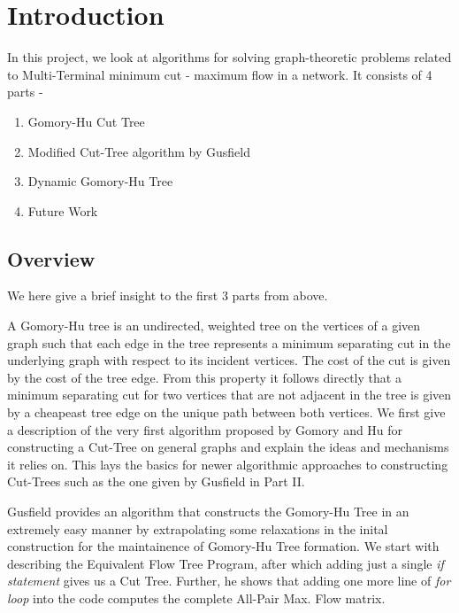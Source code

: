\chapter{Introduction}
    In this project, we look at algorithms for solving graph-theoretic problems related to Multi-Terminal minimum cut - maximum flow in a network. It consists of 4 parts - 
    \begin{enumerate}
        \item {Gomory-Hu Cut Tree}
        \item {Modified Cut-Tree algorithm by Gusfield}
        \item {Dynamic Gomory-Hu Tree}
        \item {Future Work}
    \end{enumerate}

    \section{Overview}
    We here give a brief insight to the first 3 parts from above.
    
    \vspace{5mm}
    A Gomory-Hu tree is an undirected, weighted tree on the vertices of a given graph such that each edge in the tree represents a minimum separating cut in the underlying graph with respect to its incident
    vertices. The cost of the cut is given by the cost of the tree edge. From this property it follows directly that a minimum separating cut for two vertices that are not adjacent in the tree is given by a cheapeast tree edge on the unique path between both vertices. We first give a description of the very first algorithm proposed by Gomory and Hu for constructing a Cut-Tree on general graphs and explain the ideas and mechanisms it relies on. This lays the basics for newer algorithmic approaches to constructing Cut-Trees such as the one given by Gusfield in Part II.

    \vspace{5mm}
    Gusfield provides an algorithm that constructs the Gomory-Hu Tree in an extremely easy manner by extrapolating some relaxations in the inital construction for the maintainence of Gomory-Hu Tree formation. We start with describing the Equivalent Flow Tree Program, after which adding just a single \textit{if statement} gives us a Cut Tree. Further, he shows that adding one more line of \textit{for loop} into the code computes the complete All-Pair Max. Flow matrix.

